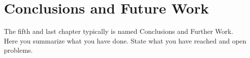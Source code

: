 \chapter{Conclusions and Future Work} \label{chapter_five}

The fifth and last chapter typically is named {Conclusions and Further Work}. Here you summarize what you have done. State what you have reached and open problems.